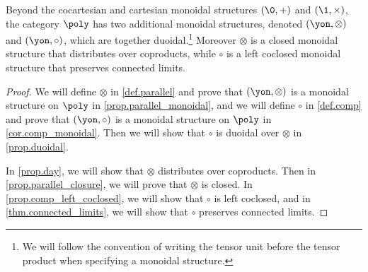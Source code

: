 \begin{proposition}
    Beyond the cocartesian and cartesian monoidal structures $(\0,+)$ and $(\1,\times)$, the category $\poly$ has two additional monoidal structures, denoted $(\yon,\otimes)$ and $(\yon,\circ)$, which are together duoidal.\footnote{We will follow the convention of writing the tensor unit before the tensor product when specifying a monoidal structure.} Moreover $\otimes$ is a closed monoidal structure that distributes over coproducts, while $\circ$ is a left coclosed monoidal structure that preserves connected limits.
\end{proposition}
\begin{proof}
    We will define $\otimes$ in \cref{def.parallel} and prove that $(\yon, \otimes)$ is a monoidal structure on $\poly$ in \cref{prop.parallel_monoidal}, and we will define $\circ$ in \cref{def.comp} and prove that $(\yon, \circ)$ is a monoidal structure on $\poly$ in \cref{cor.comp_monoidal}.
    Then we will show that $\circ$ is duoidal over $\otimes$ in \cref{prop.duoidal}.

    In \cref{prop.day}, we will show that $\otimes$ distributes over coproducts.
    Then in \cref{prop.parallel_closure}, we will prove that $\otimes$ is closed.
    In \cref{prop.comp_left_coclosed}, we will show that $\circ$ is left coclosed, and in \cref{thm.connected_limits}, we will show that $\circ$ preserves connected limits.
\end{proof}

